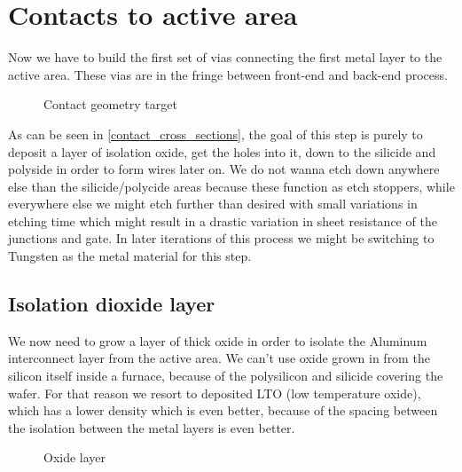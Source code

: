 \section{Contacts to active area}\label{contact}

Now we have to build the first set of vias connecting the first metal layer to the active area.
These vias are in the fringe between front-end and back-end process.

\begin{figure}[H]
	\centering
	\begin{tikzpicture}[node distance = 3cm, auto, thick,scale=\CrossAndTopSectionBig, every node/.style={transform shape}]
		
	\end{tikzpicture}
	\caption{Contact geometry target}
	\label{contact_cross_sections}
\end{figure}

As can be seen in \autoref{contact_cross_sections}, the goal of this step is purely to deposit a layer of isolation oxide, get the holes into it, down to the silicide and polyside in order to form wires later on.
We do not wanna etch down anywhere else than the silicide/polycide areas because these function as etch stoppers, while everywhere else we might etch further than desired with small variations in etching time which might result in a drastic variation in sheet resistance of the junctions and gate.
In later iterations of this process we might be switching to Tungsten as the metal material for this step.

\newpage

\subsection{Isolation dioxide layer}

We now need to grow a layer of thick oxide in order to isolate the Aluminum interconnect layer from the active area.
We can't use oxide grown in from the silicon itself inside a furnace, because of the polysilicon and silicide covering the wafer.
For that reason we resort to deposited LTO (low temperature oxide), which has a lower density which is even better, because of the spacing between the isolation between the metal layers is even better.

\begin{figure}[H]
	\centering
	\begin{tikzpicture}[node distance = 3cm, auto, thick,scale=\CrossSectionOnly, every node/.style={transform shape}]
		
	\end{tikzpicture}
	\begin{tikzpicture}[node distance = 3cm, auto, thick,scale=\CrossSectionOnly, every node/.style={transform shape}]
		
	\end{tikzpicture}
	\caption{Oxide layer}
\end{figure}

